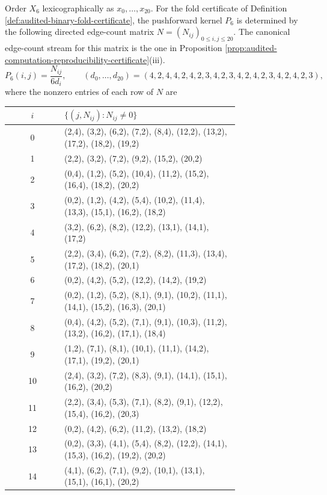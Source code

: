 \begin{proposition}\label{prop:foldbin6-exact-pushforward-matrix}
Order \(X_6\) lexicographically as \(x_0,\ldots,x_{20}\).  For the fold certificate of Definition \ref{def:audited-binary-fold-certificate}, the pushforward kernel \(P_6\) is determined by the following directed edge-count matrix \(N=(N_{ij})_{0\le i,j\le 20}\).  The canonical edge-count stream for this matrix is the one in Proposition \ref{prop:audited-computation-reproducibility-certificate}\textup{(iii)}.
\[
P_6(i,j)=\frac{N_{ij}}{6d_i},
\qquad
(d_0,\ldots,d_{20})=(4,2,4,4,2,4,2,3,4,2,3,4,2,4,2,3,4,2,4,2,3),
\]
where the nonzero entries of each row of \(N\) are
\begin{center}
\scriptsize
\setlength{\tabcolsep}{3pt}
\renewcommand{\arraystretch}{1.12}
\begin{tabular}{c|p{0.76\linewidth}}
\(i\)&\(\{(j,N_{ij}):N_{ij}\ne0\}\)\\ \hline
0&(2,4), (3,2), (6,2), (7,2), (8,4), (12,2), (13,2), (17,2), (18,2), (19,2)\\
1&(2,2), (3,2), (7,2), (9,2), (15,2), (20,2)\\
2&(0,4), (1,2), (5,2), (10,4), (11,2), (15,2), (16,4), (18,2), (20,2)\\
3&(0,2), (1,2), (4,2), (5,4), (10,2), (11,4), (13,3), (15,1), (16,2), (18,2)\\
4&(3,2), (6,2), (8,2), (12,2), (13,1), (14,1), (17,2)\\
5&(2,2), (3,4), (6,2), (7,2), (8,2), (11,3), (13,4), (17,2), (18,2), (20,1)\\
6&(0,2), (4,2), (5,2), (12,2), (14,2), (19,2)\\
7&(0,2), (1,2), (5,2), (8,1), (9,1), (10,2), (11,1), (14,1), (15,2), (16,3), (20,1)\\
8&(0,4), (4,2), (5,2), (7,1), (9,1), (10,3), (11,2), (13,2), (16,2), (17,1), (18,4)\\
9&(1,2), (7,1), (8,1), (10,1), (11,1), (14,2), (17,1), (19,2), (20,1)\\
10&(2,4), (3,2), (7,2), (8,3), (9,1), (14,1), (15,1), (16,2), (20,2)\\
11&(2,2), (3,4), (5,3), (7,1), (8,2), (9,1), (12,2), (15,4), (16,2), (20,3)\\
12&(0,2), (4,2), (6,2), (11,2), (13,2), (18,2)\\
13&(0,2), (3,3), (4,1), (5,4), (8,2), (12,2), (14,1), (15,3), (16,2), (19,2), (20,2)\\
14&(4,1), (6,2), (7,1), (9,2), (10,1), (13,1), (15,1), (16,1), (20,2)\\

\end{tabular}
\end{center}
\end{proposition}
